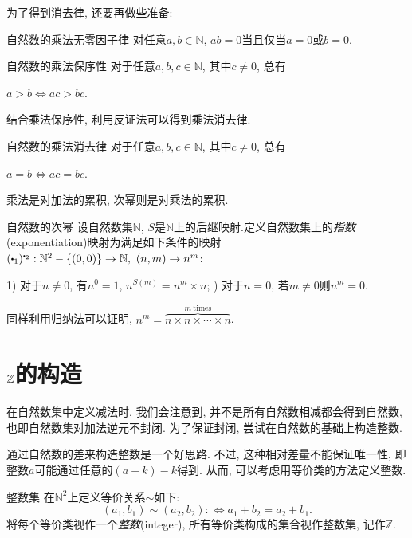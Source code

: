 为了得到消去律, 还要再做些准备: 

\begin{proposition}{自然数的乘法无零因子律}
	对任意$a, b \in \mathbb{N}$, $ab=0$当且仅当$a=0$或$b=0$.
\end{proposition}

\begin{proposition}{自然数的乘法保序性}
	对于任意$a, b, c \in \mathbb{N}$, 其中$c \neq 0$, 总有
	\begin{center}
		$a>b \Leftrightarrow ac>bc.$
	\end{center}
\end{proposition}

结合乘法保序性, 利用反证法可以得到乘法消去律.

\begin{corollary}{自然数的乘法消去律}
	对于任意$a, b, c \in \mathbb{N}$, 其中$c \neq 0$, 总有
	\begin{center}
		$a=b \Leftrightarrow ac=bc.$
	\end{center}
\end{corollary}

乘法是对加法的累积, 次幂则是对乘法的累积.

\begin{definition}{自然数的次幂}
	设自然数集$\mathbb{N}$, $S$是$\mathbb{N}$上的后继映射.定义自然数集上的\textit{指数}(exponentiation)映射为满足如下条件的映射$(\bigcdot _1) ^{\bigcdot _2} : \mathbb{N}^2-\{ (0, 0) \} \to \mathbb{N}, ~(n, m) \to n^m$: 
	
	1) 对于$n \neq 0$, 有$n^0=1$, $n^{S(m)}=n^m \times n$; ) 对于$n = 0$, 若$m \neq 0$则$n^m=0$.
\end{definition}

同样利用归纳法可以证明, $n^m = \overbrace{n\times n\times \cdots \times n}^{m~ \text{times}}$.


\newpage
\section{$\mathbb{Z}$的构造}

在自然数集中定义减法时, 我们会注意到, 并不是所有自然数相减都会得到自然数, 也即自然数集对加法逆元不封闭. 为了保证封闭, 尝试在自然数的基础上构造整数.

通过自然数的差来构造整数是一个好思路. 不过, 这种相对差量不能保证唯一性, 即整数$a$可能通过任意的$(a+k)-k$得到. 从而, 可以考虑用等价类的方法定义整数. 

\begin{definition}{整数集}
	在$\mathbb{N}^2$上定义等价关系$\sim$如下: $$(a_1, b_1) \sim (a_2, b_2) : \Leftrightarrow a_1+b_2=a_2+b_1.$$
	将每个等价类视作一个\textit{整数}(integer), 所有等价类构成的集合视作整数集, 记作$\mathbb{Z}$.
\end{definition}


